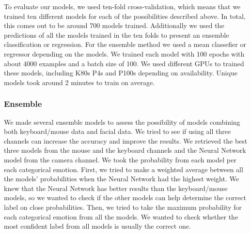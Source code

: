 \documentclass[../main.tex]{subfiles}
\begin{document}
    To evaluate our models, we used ten-fold cross-validation, which means that we trained ten different models for each of 
    the possibilities described above. In total, this comes out to be around 700 models trained. Additionally we used the predictions
    of all the models trained in the ten folds to present an ensemble classification or regression. For the ensemble method we used a 
    mean classefier or regressor depending on the models. 
    We trained each model with 100 epochs with about 4000 examples and a batch size of 100. We used different GPUs to trained these models, 
    including K80s P4s and P100s depending on availability. Unique models took around 2 minutes to train on average.

    \subsubsection{Ensemble} \label{section:methodology_ensemble}
    We made several ensemble models to assess the possibility of models combining both keyboard/mouse data and facial data. 
    We tried to see if using all three channels can increase the accuracy and improve the results. We retrieved the best three models from the 
    mouse and the keyboard channels and the Neural Network model from the camera channel. We took the probability from each model per each categorical emotion. 
    First, we tried to make a weighted average between all the models' probabilities when the Neural Network had the highest weight. 
    We knew that the Neural Network has better results than the keyboard/mouse models,
    so we wanted to check if the other models can help determine the correct label on close probabilities. 
    Then, we tried to take the maximum probability for each categorical emotion from all the models. We wanted to check whether the 
    most confident label from all models is usually the correct one.
\end{document}
